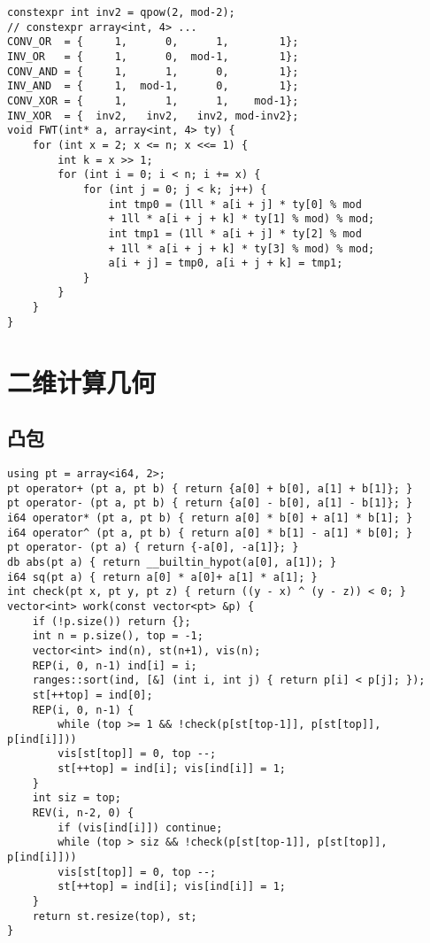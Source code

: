 \documentclass[a4paper,landscape,twocolumn]{ctexart}
\begin{document}
\begin{lstlisting}
constexpr int inv2 = qpow(2, mod-2);
// constexpr array<int, 4> ...
CONV_OR  = {     1,      0,      1,        1};
INV_OR   = {     1,      0,  mod-1,        1};
CONV_AND = {     1,      1,      0,        1};
INV_AND  = {     1,  mod-1,      0,        1};
CONV_XOR = {     1,      1,      1,    mod-1};
INV_XOR  = {  inv2,   inv2,   inv2, mod-inv2};
void FWT(int* a, array<int, 4> ty) {
	for (int x = 2; x <= n; x <<= 1) {
		int k = x >> 1;
		for (int i = 0; i < n; i += x) {
			for (int j = 0; j < k; j++) {
				int tmp0 = (1ll * a[i + j] * ty[0] % mod
				+ 1ll * a[i + j + k] * ty[1] % mod) % mod;
				int tmp1 = (1ll * a[i + j] * ty[2] % mod
				+ 1ll * a[i + j + k] * ty[3] % mod) % mod;
				a[i + j] = tmp0, a[i + j + k] = tmp1;
			}
		}
	}
}
\end{lstlisting}

\section{二维计算几何}

\subsection{凸包}

\begin{lstlisting}
using pt = array<i64, 2>;
pt operator+ (pt a, pt b) { return {a[0] + b[0], a[1] + b[1]}; }
pt operator- (pt a, pt b) { return {a[0] - b[0], a[1] - b[1]}; }
i64 operator* (pt a, pt b) { return a[0] * b[0] + a[1] * b[1]; }
i64 operator^ (pt a, pt b) { return a[0] * b[1] - a[1] * b[0]; }
pt operator- (pt a) { return {-a[0], -a[1]}; }
db abs(pt a) { return __builtin_hypot(a[0], a[1]); }
i64 sq(pt a) { return a[0] * a[0]+ a[1] * a[1]; }
int check(pt x, pt y, pt z) { return ((y - x) ^ (y - z)) < 0; }
vector<int> work(const vector<pt> &p) {
	if (!p.size()) return {};
	int n = p.size(), top = -1;
	vector<int> ind(n), st(n+1), vis(n);
	REP(i, 0, n-1) ind[i] = i;
	ranges::sort(ind, [&] (int i, int j) { return p[i] < p[j]; });
	st[++top] = ind[0];
	REP(i, 0, n-1) {
		while (top >= 1 && !check(p[st[top-1]], p[st[top]], p[ind[i]]))
		vis[st[top]] = 0, top --;
		st[++top] = ind[i]; vis[ind[i]] = 1;
	}
	int siz = top;
	REV(i, n-2, 0) {
		if (vis[ind[i]]) continue;
		while (top > siz && !check(p[st[top-1]], p[st[top]], p[ind[i]]))
		vis[st[top]] = 0, top --;
		st[++top] = ind[i]; vis[ind[i]] = 1;
	}
	return st.resize(top), st;
}
\end{lstlisting}
\end{document}
